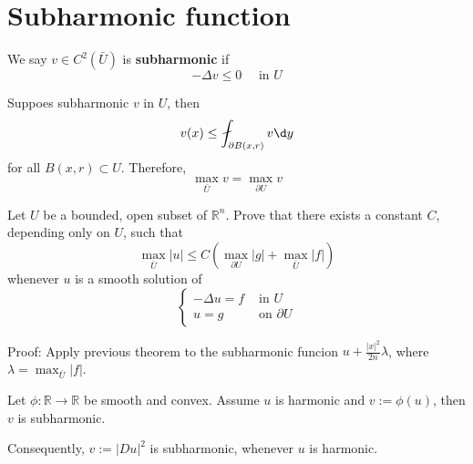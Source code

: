 \section{Subharmonic function}
\begin{definition}
    We say $v \in C^2(\bar{U})$ is \textbf{subharmonic} if
    \begin{equation*}
        -\Delta v \leq 0 \quad \text { in } U
    \end{equation*}
\end{definition}
\begin{theorem}
    Suppoes subharmonic $v$ in $U$, then
    \begin{equation*}
        v(x) \leq \fint_{\partial {B(x, r)}} v \d y
    \end{equation*}
    for all $B(x, r)\subset U$. Therefore,
    \begin{equation*}
        \max_{\bar{U}} v = \max_{\partial U} v
    \end{equation*}
\end{theorem}
\begin{corollary}
    Let $U$ be a bounded, open subset of $\mathbb{R}^n$. Prove that there exists a constant $C$, depending only on $U$, such that
    \begin{equation*}
        \max _{\bar{U}}|u| \leq C\left(\max _{\partial U}|g|+\max _{\bar{U}}|f|\right)
    \end{equation*}
    whenever $u$ is a smooth solution of
    \begin{equation*}
        \left\{\begin{aligned}
            -\Delta u=f & \text { in } U          \\
            u=g         & \text { on } \partial U
        \end{aligned}\right.
    \end{equation*}

    Proof:
    Apply previous theorem to the subharmonic funcion $u+\frac{\left|x\right|^2}{2n}\lambda$, where $\lambda=\max_{\bar{U}} \left|f\right|$.
\end{corollary}
\begin{theorem}
    Let $\phi: \mathbb{R} \rightarrow \mathbb{R}$ be smooth and convex. Assume $u$ is harmonic and $v:=\phi(u)$, then $v$ is subharmonic.

    Consequently, $v:=|D u|^2$ is subharmonic, whenever $u$ is harmonic.
\end{theorem}
